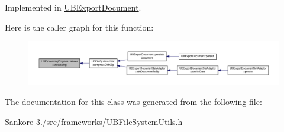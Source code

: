 Implemented in \hyperlink{class_u_b_export_document_a3793fcd1f227b97c4d314817d66463d1}{U\-B\-Export\-Document}.



Here is the caller graph for this function\-:
\nopagebreak
\begin{figure}[H]
\begin{center}
\leavevmode
\includegraphics[width=350pt]{de/d63/class_u_b_processing_progress_listener_a2354b4744b890f761293e6425485d2b5_icgraph}
\end{center}
\end{figure}




The documentation for this class was generated from the following file\-:\begin{DoxyCompactItemize}
\item 
Sankore-\/3./src/frameworks/\hyperlink{_u_b_file_system_utils_8h}{U\-B\-File\-System\-Utils.\-h}\end{DoxyCompactItemize}
